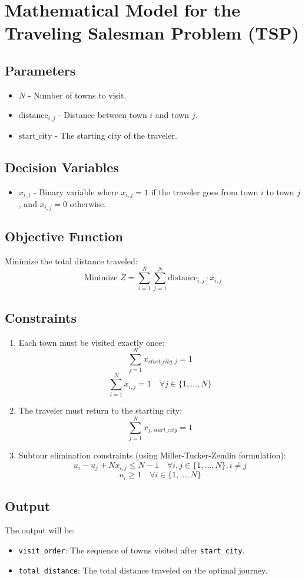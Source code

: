 \documentclass{article}
\begin{document}
\section*{Mathematical Model for the Traveling Salesman Problem (TSP)}

\subsection*{Parameters}
\begin{itemize}
    \item \( N \) - Number of towns to visit.
    \item \( \text{distance}_{i,j} \) - Distance between town \( i \) and town \( j \).
    \item \( \text{start\_city} \) - The starting city of the traveler.
\end{itemize}

\subsection*{Decision Variables}
\begin{itemize}
    \item \( x_{i,j} \) - Binary variable where \( x_{i,j} = 1 \) if the traveler goes from town \( i \) to town \( j \), and \( x_{i,j} = 0 \) otherwise.
\end{itemize}

\subsection*{Objective Function}
Minimize the total distance traveled:
\[
\text{Minimize } Z = \sum_{i=1}^{N} \sum_{j=1}^{N} \text{distance}_{i,j} \cdot x_{i,j}
\]

\subsection*{Constraints}
\begin{enumerate}
    \item Each town must be visited exactly once:
    \[
    \sum_{j=1}^{N} x_{start\_city,j} = 1
    \]
    \[
    \sum_{i=1}^{N} x_{i,j} = 1 \quad \forall j \in \{1, \ldots, N\}
    \]
    
    \item The traveler must return to the starting city:
    \[
    \sum_{j=1}^{N} x_{j,start\_city} = 1
    \]
    
    \item Subtour elimination constraints (using Miller-Tucker-Zemlin formulation):
    \[
    u_i - u_j + N x_{i,j} \leq N - 1 \quad \forall i,j \in \{1, \ldots, N\}, i \neq j
    \]
    \[
    u_i \geq 1 \quad \forall i \in \{1, \ldots, N\}
    \]
\end{enumerate}

\subsection*{Output}
The output will be:
\begin{itemize}
    \item \texttt{visit\_order}: The sequence of towns visited after \texttt{start\_city}.
    \item \texttt{total\_distance}: The total distance traveled on the optimal journey.
\end{itemize}
\end{document}
